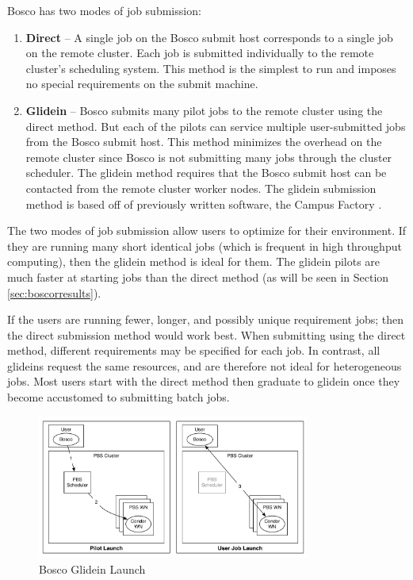 Bosco has two modes of job submission:
\begin{enumerate}
	\item \textbf{Direct} -- A single job on the Bosco submit host corresponds to a single job on the remote cluster.  Each job is submitted individually to the remote cluster's scheduling system.  This method is the simplest to run and imposes no special requirements on the submit machine.
	
	\item \textbf{Glidein} -- Bosco submits many pilot jobs to the remote cluster using the direct method.  But each of the pilots can service multiple user-submitted jobs from the Bosco submit host.  This method minimizes the overhead on the remote cluster since Bosco is not submitting many jobs through the cluster scheduler.  The glidein method requires that the Bosco submit host can be contacted from the remote cluster worker nodes. \label{sec:glidein}  The glidein submission method is based off of previously written software, the Campus Factory \cite{weitzel2011campus}.
\end{enumerate}

The two modes of job submission allow users to optimize for their environment.  If they are running many short identical jobs (which is frequent in high throughput computing), then the glidein method is ideal for them.  The glidein pilots are much faster at starting jobs than the direct method (as will be seen in Section \ref{sec:boscorresults}).

If the users are running fewer, longer, and possibly unique requirement jobs; then the direct submission method would work best.  When submitting using the direct method, different requirements may be specified for each job.  In contrast, all glideins request the same resources, and are therefore not ideal for heterogeneous jobs.  Most users start with the direct method then graduate to glidein once they become accustomed to submitting batch jobs.

\begin{figure}[h!t]
	\centering
	\includegraphics[width=0.8\textwidth]{images/BoscoGlideinLaunch.pdf}
	\caption{Bosco Glidein Launch}
	\label{fig:boscoglideinlaunch}
\end{figure}

